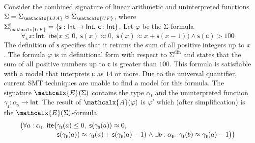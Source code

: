 \documentclass[runningheads,a4paper]{llncs}
\newcommand{\con}[1]{\mathsf{#1}}
\let\const=\con
\let\oldSigma=\Sigma
\def\Sigma{\mathrm{\oldSigma}}
\let\oldwedge=\wedge
\def\wedge{\mathrel{\oldwedge}}
\newcommand{\teq}{\approx}
\newcommand{\conv}{\mathcalx{A}}
\newcommand{\stypes}[1]{#1^\mathrm{ty}}
\newcommand{\sfuns}[1]{#1^\mathrm{f}}
\newcommand{\sfundefs}[1]{#1^\mathrm{dfn}}
\newcommand{\typeint}{\ty{Int}}
\newcommand\ty[1]{\con{#1}}
\newcommand{\lite}{\con{ite}}
\newcommand\concret{\gamma} %
\newcommand{\forallf}[1]{\forall_{\!#1\:}}
\newcommand{\farg}[1]{\concret_{#1}}
\newcommand{\fargtype}[1]{\alpha_{#1}}
\newcommand{\Sigmalia}{\Sigma_{\mathcalx{LIA}}}
\newcommand{\extendsig}[1]{\mathcalx{E}( #1 )}
\newcommand{\rem}[1]{\textcolor{red}{[#1]}}
\newcommand{\jb}[1]{\rem{#1 --jb}}
\newcommand{\ct}[1]{\rem{#1 --ct}}
\newcommand{\euf}{\ensuremath{\mathcalx{UF}}\xspace}
\begin{document}
\begin{example}
\label{ex:translation}
Consider the combined signature of linear arithmetic and uninterpreted
functions $\Sigma = \Sigmalia \mathrel{\uplus} \Sigma_{\euf}$, where
$\sfuns{\Sigma_{\euf}} = \{ \con{s} : { \typeint \rightarrow \typeint },\, \const{c} : { \typeint } \}$.
Let $\varphi$ be the $\Sigma$-formula
\begin{equation} \label{eq:ex-before}
\forallf{\con{s}} x : {\typeint}.\;\, \lite\bigl( x \leq 0,\; \con{s}(x) \teq 0,\;
  \con{s}( x ) \teq x + \con{s}( x - 1 ) \bigr) \wedge \con{s}( \con{c} ) > 100
\end{equation}
%
The definition of $\const{s}$ specifies that it returns the sum of all
positive integers up to $x$. The formula $\varphi$ is in definitional form with
respect to $\sfundefs{\Sigma}$ 
and states that the sum of all
positive numbers up to $\const{c}$ is greater than $100$. This formula is
satisfiable with a model that interprets $\const{c}$ as $14$ or more.
Due to the universal quantifier,
current SMT techniques
are unable to find
a model for this formula. The signature $\extendsig{\Sigma}$ contains the type
$\fargtype{\con{s}}$ and the uninterpreted function $\farg{\con{s}} : \fargtype{\con{s}}
\rightarrow \typeint$. The result of $\conv( \varphi )$ 
is $\varphi'$ which (after simplification) is the $\extendsig{\Sigma}$-formula
%
\begin{equation} \label{eq:ex-after}
\!\begin{aligned}[c]
  & \phantom{{\wedge}\; }\bigl(
      \forall a : \fargtype{\con{s}}.\; \lite\bigl(
        \!\begin{aligned}[t]
         &  \farg{\con{s}}( a ) \leq 0,\;
          \con{s}(\farg{\con{s}}( a )) \teq 0,\;
\\[-\jot]
  & \con{s}(\farg{\con{s}}( a )) \teq \farg{\con{s}}( a ) + \con{s}( \farg{\con{s}}( a )-1 )
    \wedge \exists b : {\fargtype{\con{s}}}.\;\, \farg{\con{s}}( b ) \teq \farg{\con{s}}( a )-1 \bigr) \bigr)

\end{aligned}
\end{aligned}
\end{equation}
\end{example}
\end{document}
